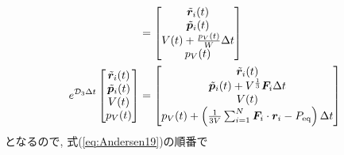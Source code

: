 \begin{align}
 &=
 \begin{bmatrix}
  \Tilde{\bm{r}}_{i}(t)
  \\
  \Tilde{\bm{p}}_{i}(t)
  \\
  V(t) + \frac{p_{V}(t)}{W} \Delta t
  \\
  p_{V}(t)
 \end{bmatrix}
 \label{eq:Andersen20.2}
 \\
 e^{\mathcal{D}_{3} \Delta t}
 \begin{bmatrix}
  \Tilde{\bm{r}}_{i} (t) \\
  \Tilde{\bm{p}}_{i} (t) \\
  V (t) \\
  p_{V} (t)
 \end{bmatrix}
 &=
 \begin{bmatrix}
  \Tilde{\bm{r}}_{i}(t)
  \\
  \Tilde{\bm{p}}_{i}(t) + V^{\frac{1}{3}} \bm{F}_{i} \Delta t
  \\
  V(t)
  \\
  p_{V}(t)
  + \left(
  \frac{1}{3V} \sum_{i=1}^{N} \bm{F}_{i} \cdot \bm{r}_{i} - P_{\mathrm{eq}}
  \right) \Delta t
 \end{bmatrix}
 \label{eq:Andersen20.3}
 \end{align}
 となるので, 式(\ref{eq:Andersen19})の順番で
